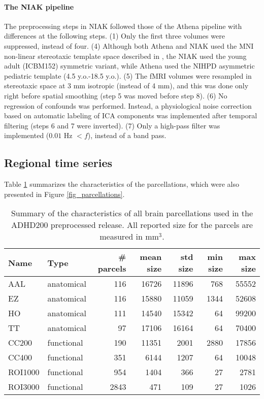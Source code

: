 \documentclass[preprint,12pt,3p]{elsarticle}
\begin{document}
\begin{itemize}
\paragraph{The NIAK pipeline} The preprocessing steps in NIAK followed those of the Athena pipeline with differences at the following steps. (1) Only the first three volumes were suppressed, instead of four. (4) Although both Athena and NIAK used the MNI non-linear stereotaxic template space described in \citep{fonov2011unbiased}, the NIAK used the young adult (ICBM152) symmetric variant, while Athena used the NIHPD asymmetric pediatric template (4.5 y.o.-18.5 y.o.). (5) The fMRI volumes were resampled in stereotaxic space at 3 mm isotropic (instead of 4 mm), and this was done only right before spatial smoothing (step 5 was moved before step 8). (6) No regression of confounds was performed. Instead, a physiological noise correction based on automatic labeling of ICA components was implemented \citep{perlbarg2007corsica} after temporal filtering (steps 6 and 7 were inverted). (7) Only a high-pass filter was implemented ($0.01$ Hz $< f$), instead of a band pass. 

\subsection{Regional time series}
Table \ref{tab_parcellations} summarizes the characteristics of the parcellations, which were also presented in Figure \ref{fig_parcellations}. 
\begin{table}[htbp]
\label{tab_parcellations}
\caption{Summary of the characteristics of all brain parcellations used in the ADHD200 preprocessed release. All reported size for the parcels are measured in mm$^3$.}
\begin{tabular}{llrrrrr}
Name & Type & \# parcels & mean size & std size & min size & max size \\
\hline
AAL	    & anatomical &  116 &  16726 & 11896 &  768 & 55552\\
EZ	    & anatomical &  116 &  15880 & 11059 & 1344 & 52608\\
HO	    & anatomical &  111 &  14540 & 15342 &   64 & 99200\\
TT	    & anatomical & 	 97 &  17106 & 16164 &   64 & 70400\\
CC200   & functional &  190 &  11351 &  2001 & 2880 & 17856\\
CC400   & functional &  351 &   6144 &  1207 &   64 & 10048\\
ROI1000 & functional &  954 &   1404 &   366 &   27 & 2781\\
ROI3000	& functional & 2843	&    471 &   109 &   27 & 1026\\
\end{tabular}
\end{table}


\end{itemize}
\end{document}
